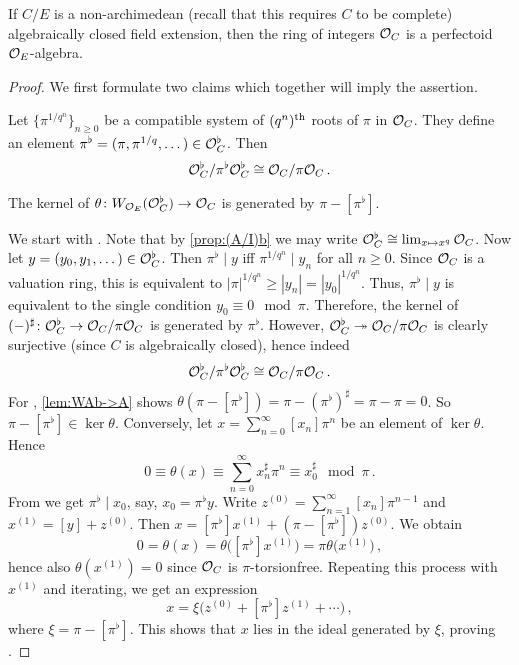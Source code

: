 \label{exm:OCperfectoid}
If $C/E$ is a non-archimedean (recall that this requires $C$ to be complete) algebraically closed field extension, then the ring of integers $\mathcal{O}_C$ is a perfectoid $\mathcal{O}_E$-algebra.
\begin{proof}
	We first formulate two claims which together will imply the assertion.
	\begin{numerate}
		\item Let $\{\pi^{1/q^n}\}_{n\geq 0}$ be a compatible system of $(q^n)^{\text{th}}$ roots of $\pi$ in $\mathcal{O}_C$. They define an element $\pi^\flat=(\pi,\pi^{1/q},\dotsc)\in\mathcal{O}_C^\flat$. Then 
		\begin{equation*}
			\mathcal{O}_C^\flat/\pi^\flat\mathcal{O}_C^\flat\cong\mathcal{O}_C/\pi\mathcal{O}_C\,.
		\end{equation*}
		\item The kernel of $\theta\colon W_{\Oo_E}(\Oo_C^\flat)\morphism\Oo_C$ is generated by $\pi-[\pi^\flat]$.
	\end{numerate}
	We start with . Note that by \cref{prop:(A/I)b} we may write $\mathcal{O}_C^\flat\cong \operatorname*{lim}_{x\mapsto x^q}\mathcal{O}_C$. Now let $y=(y_0,y_1,\dotsc)\in\mathcal{O}_C^\flat$. Then $\pi^\flat\mid y$ iff $\pi^{1/q^n}\mid y_n$ for all $n\geq 0$. Since $\mathcal{O}_C$ is a valuation ring, this is equivalent to $|\pi|^{1/q^n}\geq |y_n|=|y_0|^{1/q^n}$. Thus, $\pi^\flat\mid y$ is equivalent to the single condition $y_0\equiv 0\mod \pi$. Therefore, the kernel of $(-)^\sharp\colon \Oo_C^\flat\morphism \Oo_C/\pi\Oo_C$ is generated by $\pi^\flat$. However, $\Oo_C^\flat\epimorphism \Oo_C/\pi\Oo_C$ is clearly surjective (since $C$ is algebraically closed), hence indeed
	\begin{equation*}
		\mathcal{O}_C^\flat/\pi^\flat\mathcal{O}_C^\flat\cong \mathcal{O}_C/\pi\mathcal{O}_C\,.
	\end{equation*}
	For , \cref{lem:WAb->A} shows $\theta(\pi-[\pi^\flat])=\pi-(\pi^\flat)^\sharp=\pi-\pi=0$. So $\pi-[\pi^\flat]\in\ker\theta$. Conversely, let $x=\sum_{n=0}^\infty[x_n]\pi^n$ be an element of $\ker\theta$. Hence
	\begin{equation*}
		0\equiv \theta(x)\equiv \sum_{n=0}^\infty x_n^\sharp\pi^n\equiv x_0^\sharp\mod \pi\,.
	\end{equation*}
	From  we get $\pi^\flat\mid x_0$, say, $x_0=\pi^\flat y$. Write $z^{(0)}=\sum_{n=1}^\infty [x_n]\pi^{n-1}$ and $x^{(1)}=[y]+z^{(0)}$. Then $x=[\pi^\flat]x^{(1)}+(\pi-[\pi^\flat])z^{(0)}$. We obtain
	\begin{equation*}
		0=\theta(x)=\theta\big([\pi^\flat]x^{(1)}\big)=\pi\theta\big(x^{(1)}\big)\,,
	\end{equation*}
	hence also $\theta(x^{(1)})=0$ since $\mathcal{O}_C$ is $\pi$-torsionfree. Repeating this process with $x^{(1)}$ and iterating, we get an expression
	\begin{equation*}
		x=\xi\big(z^{(0)}+[\pi^\flat]z^{(1)}+\dotsb\big)\,,
	\end{equation*}
	where $\xi=\pi-[\pi^\flat]$. This shows that $x$ lies in the ideal generated by $\xi$, proving .
	

\end{proof}
